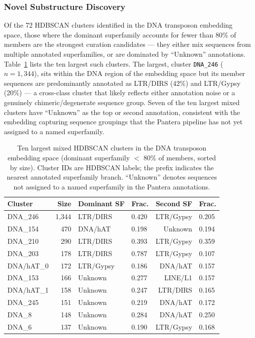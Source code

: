 \documentclass[12pt]{article}
\begin{document}
\subsubsection{Novel Substructure Discovery}

Of the 72 HDBSCAN clusters identified in the DNA transposon embedding space, those where the dominant superfamily accounts for fewer than 80\% of members are the strongest curation candidates --- they either mix sequences from multiple annotated superfamilies, or are dominated by ``Unknown'' annotations. Table~\ref{tab:novel_subclusters} lists the ten largest such clusters. The largest, cluster \texttt{DNA\_246} ($n=1{,}344$), sits within the DNA region of the embedding space but its member sequences are predominantly annotated as LTR/DIRS (42\%) and LTR/Gypsy (20\%) --- a cross-class cluster that likely reflects either annotation noise or a genuinely chimeric/degenerate sequence group. Seven of the ten largest mixed clusters have ``Unknown'' as the top or second annotation, consistent with the embedding capturing sequence groupings that the Pantera pipeline has not yet assigned to a named superfamily.

\begin{table}[h]
\centering
\caption{Ten largest mixed HDBSCAN clusters in the DNA transposon embedding space (dominant superfamily $<$ 80\% of members, sorted by size). Cluster IDs are HDBSCAN labels; the prefix indicates the nearest annotated superfamily branch. ``Unknown'' denotes sequences not assigned to a named superfamily in the Pantera annotations.}
\label{tab:novel_subclusters}
\small
\begin{tabular}{lrllrl}
\toprule
Cluster & Size & Dominant SF & Frac. & Second SF & Frac. \\
\midrule
DNA\_246      & 1{,}344 & LTR/DIRS   & 0.420 & LTR/Gypsy & 0.205 \\
DNA\_154      & 470     & DNA/hAT    & 0.198 & Unknown   & 0.194 \\
DNA\_210      & 290     & LTR/DIRS   & 0.393 & LTR/Gypsy & 0.359 \\
DNA\_203      & 178     & LTR/DIRS   & 0.787 & LTR/Gypsy & 0.107 \\
DNA/hAT\_0   & 172     & LTR/Gypsy  & 0.186 & DNA/hAT   & 0.157 \\
DNA\_153      & 166     & Unknown    & 0.277 & LINE/L1   & 0.157 \\
DNA/hAT\_1   & 158     & Unknown    & 0.247 & LTR/DIRS  & 0.165 \\
DNA\_245      & 151     & Unknown    & 0.219 & DNA/hAT   & 0.172 \\
DNA\_8        & 148     & Unknown    & 0.284 & DNA/hAT   & 0.250 \\
DNA\_6        & 137     & Unknown    & 0.190 & LTR/Gypsy & 0.168 \\
\bottomrule
\end{tabular}
\end{table}
\end{document}
